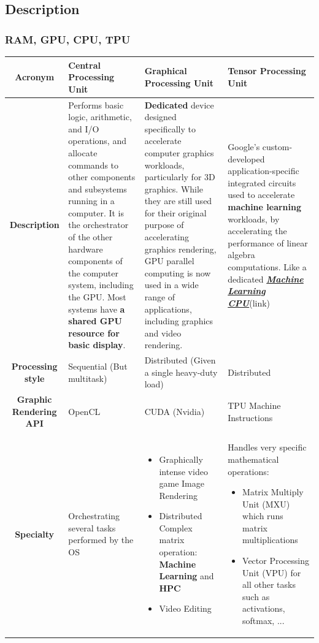 \documentclass[11pt]{beamer}
\begin{document}
\subsection{Description}
\begin{frame}
	\frametitle{RAM, GPU, CPU, TPU}
	\begin{center}
		\tiny
	\begin{tabular}{| c | p{2.5cm}| p{2.5cm} | p{2.5cm} | }
		\hline
		\textbf{Acronym} & \textbf{Central Processing Unit}  & \textbf{Graphical Processing Unit}& \textbf{Tensor Processing Unit} \\
		\hline
		\textbf{Description} & Performs basic logic, arithmetic, and I/O operations, and allocate commands to other components and subsystems running in a computer. It is the orchestrator of the other hardware components of the computer system, including the GPU. Most systems have \textbf{a shared GPU resource for basic display}.& \textbf{Dedicated} device designed specifically to accelerate computer graphics workloads, particularly for 3D graphics. While they are still used for their original purpose of accelerating graphics rendering, GPU parallel computing is now used in a wide range of applications, including graphics and video rendering.  & Google’s custom-developed application-specific integrated circuits used to accelerate \textbf{machine learning} workloads, by accelerating the performance of linear algebra computations.   Like a dedicated \href{https://cloud.google.com/tpu/docs/intro-to-tpu}{\textit{\textbf{Machine Learning CPU}}}(link) \\
		\hline
		\textbf{Processing style} & Sequential (But multitask) & Distributed (Given a single heavy-duty load)  & Distributed  \\
		\hline
		\textbf{Graphic Rendering API} & OpenCL& CUDA (Nvidia) & TPU Machine Instructions  \\
		\hline
		\textbf{Specialty} & Orchestrating several tasks performed by the OS &	\begin{itemize}
			\item Graphically intense video game Image Rendering
			\item Distributed Complex matrix operation: \textbf{Machine Learning} and \textbf{HPC}
			\item Video Editing 
		\end{itemize} & Handles very specific mathematical operations: \begin{itemize}
		\item Matrix Multiply Unit (MXU) which runs matrix multiplications 
		\item Vector Processing Unit (VPU) for all other tasks such as activations, softmax, ...
	\end{itemize}\\
		\hline  
	\end{tabular}
\end{center}
\end{frame}
\end{document}
